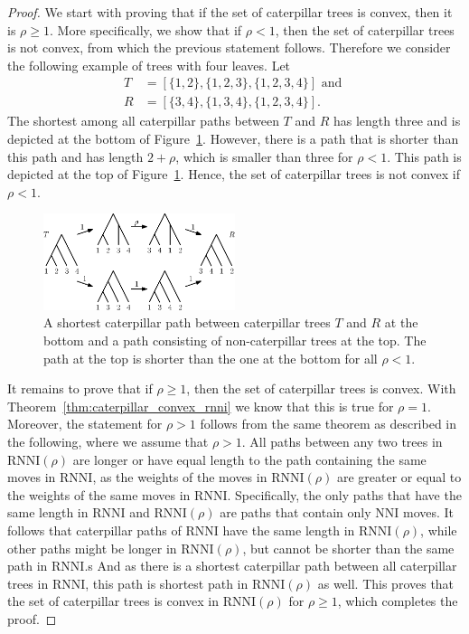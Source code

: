 \documentclass[11pt]{amsart}
\newcommand{\rnni}{\mathrm{RNNI}}
\newcommand{\nni}{\mathrm{NNI}}
\begin{document}
\begin{proof}
	We start with proving that if the set of caterpillar trees is convex, then it is $\rho \geq 1$.
	More specifically, we show that if $\rho < 1$, then the set of caterpillar trees is not convex, from which the previous statement follows.
	Therefore we consider the following example of trees with four leaves.
	Let
	\begin{align*}
		T &= [\{1,2\},\{1,2,3\},\{1,2,3,4\}]\text{ and }\\
		R &= [\{3,4\},\{1,3,4\},\{1,2,3,4\}].
	\end{align*}
	The shortest among all caterpillar paths between $T$ and $R$ has length three and is depicted at the bottom of Figure~\ref{fig:caterpillar_non_convex}.
	However, there is a path that is shorter than this path and has length $2 + \rho$, which is smaller than three for $\rho < 1$.
	This path is depicted at the top of Figure~\ref{fig:caterpillar_non_convex}.
	Hence, the set of caterpillar trees is not convex if $\rho < 1$.
	\begin{figure}[ht]
		\includegraphics[width=0.5\textwidth]{caterpillar_non_convex.eps}
		\caption{A shortest caterpillar path between caterpillar trees $T$ and $R$ at the bottom and a path consisting of non-caterpillar trees at the top.
		The path at the top is shorter than the one at the bottom for all $\rho<1$.}
		\label{fig:caterpillar_non_convex}
	\end{figure}

	It remains to prove that if $\rho \geq 1$, then the set of caterpillar trees is convex.
	With Theorem~\ref{thm:caterpillar_convex_rnni} we know that this is true for $\rho = 1$.
	Moreover, the statement for $\rho > 1$ follows from the same theorem as described in the following, where we assume that $\rho > 1$.
	All paths between any two trees in $\rnni(\rho)$ are longer or have equal length to the path containing the same moves in $\rnni$, as the weights of the moves in $\rnni(\rho)$ are greater or equal to the weights of the same moves in $\rnni$.
	Specifically, the only paths that have the same length in $\rnni$ and $\rnni(\rho)$ are paths that contain only $\nni$ moves.
	It follows that caterpillar paths of $\rnni$ have the same length in $\rnni(\rho)$, while other paths might be longer in $\rnni(\rho)$, but cannot be shorter than the same path in $\rnni$.s
	And as there is a shortest caterpillar path between all caterpillar trees in $\rnni$, this path is shortest path in $\rnni(\rho)$ as well.
	This proves that the set of caterpillar trees is convex in $\rnni(\rho)$ for $\rho \geq 1$, which completes the proof.
\end{proof}
\end{document}
